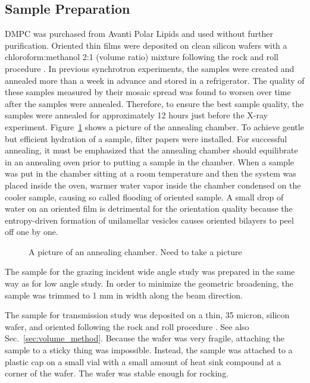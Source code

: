 \subsection{Sample Preparation}
DMPC was purchased from Avanti Polar Lipids and used without further purification.
Oriented thin films were deposited on clean silicon wafers with
a chloroform:methanol 2:1 (volume ratio) mixture following the rock and roll procedure
\cite{Tristram-Nagle07_MMB}.
In previous synchrotron experiments, the samples were created and annealed 
more than a week in advance and stored in a refrigerator. The quality of 
these samples measured by their mosaic spread was found to worsen over time
after the samples were annealed. Therefore, to ensure the best sample quality, the 
samples were annealed for approximately 12 hours just before the X-ray experiment.
Figure~\ref{fig:annealing_chamber} shows a picture of the annealing chamber. 
To achieve gentle but efficient hydration of a sample, filter papers were installed. 
For successful annealing, it must be emphasized that the annealing 
chamber should equilibrate in an annealing oven prior to putting a sample in the chamber.
When a sample was put in the chamber sitting at a room temperature and
then the system was placed inside the oven, warmer water vapor inside the chamber 
condensed on the cooler sample, causing so called flooding of oriented sample. 
A small drop of water on an oriented film is detrimental for the orientation quality because the
entropy-driven formation of unilamellar vesicles causes oriented bilayers to peel off
one by one. 

\begin{figure}[htbp]
  \centering
  \caption{A picture of an annealing chamber. Need to take a picture}
  \label{fig:annealing_chamber}
\end{figure}

The sample for the grazing incident wide angle study was prepared in the same way 
as for low angle study. In order to minimize the geometric broadening, the 
sample was trimmed to 1 mm in width along the beam direction.

The sample for transmission study was deposited on a thin, 35 micron, silicon
wafer, and oriented following the rock and roll procedure \cite{Tristram-Nagle07_MMB}. 
See also Sec.~\ref{sec:volume_method}. 
Because the wafer was very fragile, attaching the sample to a sticky 
thing was impossible. Instead, the sample was attached to a plastic cap on 
a small vial with a small amount of heat sink compound at a corner of the 
wafer. The wafer was stable enough for rocking. 

